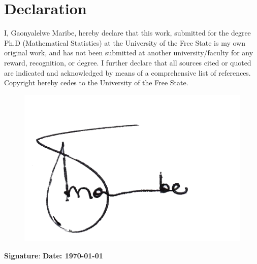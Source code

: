 \chapter*{Declaration}
\thispagestyle{empty}
I, Gaonyalelwe Maribe, hereby declare that this work, submitted for the degree Ph.D (Mathematical Statistics) at the University of the Free State is my own original work, and has not been submitted at another university/faculty for any reward, recognition, or degree. I further declare that all sources cited or quoted are indicated and acknowledged by means of a comprehensive list of references. Copyright hereby cedes to the University of the Free State.
	\vspace{0.1in}
	\begin{figure}[!h]
		\centering
		\includegraphics[viewport = 0 107 350 50,width=12cm]{./plots/signature.png}
	\end{figure}  

	\vspace {0.6in}
	\textbf{Signature}:\makebox[1.9in]{\hrulefill} \hspace{1.3in}\textbf{Date: \today} \\
\newpage

